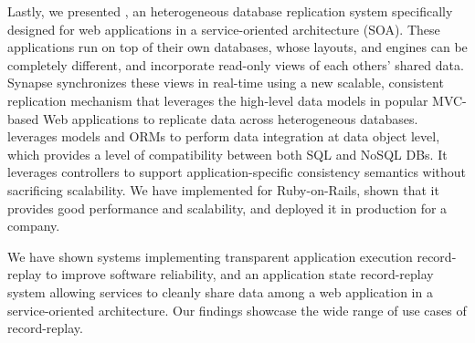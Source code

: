 Lastly, we presented \synapse, an heterogeneous database replication system
specifically designed for web applications in a service-oriented architecture (SOA).
These applications run on top of their own databases,
whose layouts, and engines can be completely different, and incorporate
read-only views of each others' shared data.  Synapse synchronizes these views
in real-time using a new scalable, consistent replication mechanism that
leverages the high-level data models in popular MVC-based Web applications to
replicate data across heterogeneous databases.
\synapse leverages models and ORMs to perform data integration
at data object level, which provides a level of compatibility between both SQL
and NoSQL DBs. It leverages controllers to support application-specific
consistency semantics without sacrificing scalability.  We have implemented
\synapse for Ruby-on-Rails, shown that it provides good performance and
scalability, and deployed it in production for a company.

We have shown systems implementing transparent application execution
record-replay to improve software reliability, and an application state
record-replay system allowing services to cleanly share data among a web
application in a service-oriented architecture. Our findings showcase the wide
range of use cases of record-replay.
